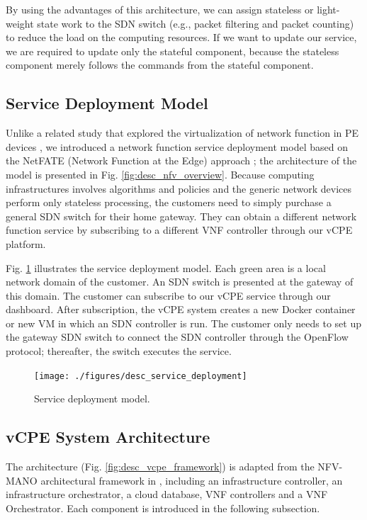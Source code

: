 \documentclass[10pt,journal]{IEEEtran}
\begin{document}
By using the advantages of this architecture, we can assign stateless or light-weight state work to the SDN switch (e.g., packet filtering and packet counting) to reduce the load on the computing resources. If we want to update our service, we are required to update only the stateful component, because the stateless component merely follows the commands from the stateful component.



\subsection{Service Deployment Model}
Unlike a related study that explored the virtualization of network function in PE devices \cite{vcpe-enhance}, we introduced a network function service deployment model based on the NetFATE (Network Function at the Edge) approach \cite{netfate}; the architecture of the model is presented in Fig. \ref{fig:desc_nfv_overview}. Because computing infrastructures involves algorithms and policies and the generic network devices perform only stateless processing, the customers need to simply purchase a general SDN switch for their home gateway. They can obtain a different network function service by subscribing to a different VNF controller through our vCPE platform.

Fig. \ref{fig:desc_service_deployment} illustrates the service deployment model. Each green area is a local network domain of the customer. An SDN switch is presented at the gateway of this domain. The customer can subscribe to our vCPE service through our dashboard. After subscription, the vCPE system creates a new Docker container or new VM in which an SDN controller is run. The customer only needs to set up the gateway SDN switch to connect the SDN controller through the OpenFlow protocol; thereafter, the switch executes the service.

\begin{figure}[!t]
\centering
\texttt{[image: ./figures/desc\_service\_deployment]}
\caption{Service deployment model.}
\label{fig:desc_service_deployment}
\end{figure}



\subsection{vCPE System Architecture}
The architecture (Fig. \ref{fig:desc_vcpe_framework}) is adapted from the NFV-MANO architectural framework in \cite{nfv2014-v111}, including an infrastructure controller, an infrastructure orchestrator, a cloud database, VNF controllers and a VNF Orchestrator. Each component is introduced in the following subsection.
\end{document}
